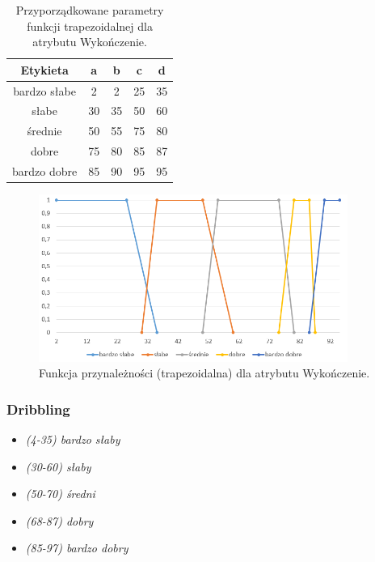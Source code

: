 \documentclass{classrep}
\begin{document}
	\begin{table}[h!]
		\centering
		\begin{tabular} {c c c c c}
			\hline
			\textbf{Etykieta} & \textbf{a} & \textbf{b} & \textbf{c} & \textbf{d} \\ [0.5ex] 
			\hline	
			\hline 
			bardzo słabe & 2 & 2 & 25 & 35  \\
			słabe & 30 & 35 & 50 & 60  \\
			średnie & 50 & 55 & 75 & 80  \\
			dobre & 75 & 80 & 85 & 87  \\
			bardzo dobre & 85 & 90 & 95 & 95  \\			
			\hline
		\end{tabular}
		\caption{Przyporządkowane parametry funkcji trapezoidalnej dla atrybutu  Wykończenie. }
		\label{tabelaWykonczenie}
	\end{table}
	
	\begin{figure}[h!]
		\centering
		\includegraphics[width=0.9\textwidth]{zmienne/5.png}
		\caption{Funkcja przynależności (trapezoidalna) dla atrybutu Wykończenie.}
		\label{wykresWykonczenie}
	\end{figure}

	
	\newpage
	\subsubsection{Dribbling}
	\begin{itemize}
		\item \textsl{(4-35) bardzo słaby}
		\item \textsl{(30-60) słaby}
		\item \textsl{(50-70) średni}
		\item \textsl{(68-87) dobry}
		\item \textsl{(85-97) bardzo dobry}
	\end{itemize}
	
\end{document}
